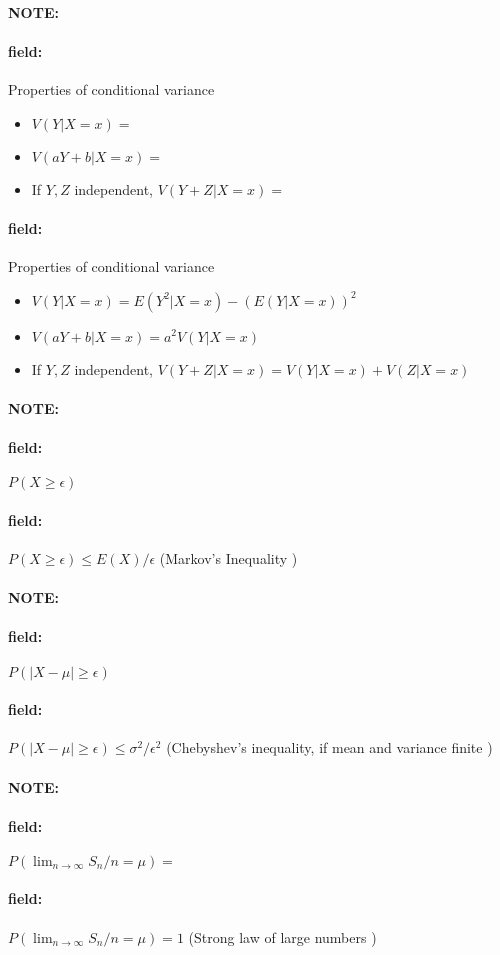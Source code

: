 \documentclass[12pt]{article}
\newenvironment{note}{\paragraph{NOTE:}}{}
\newenvironment{field}{\paragraph{field:}}{}
\begin{document}
\begin{note}
  \begin{field}
    Properties of conditional variance
    \begin{itemize}
      \item $V(Y|X=x) = $
      \item $V(aY + b | X = x) = $
      \item If $Y,Z$ independent, $V(Y+Z | X=x) = $
    \end{itemize}
  \end{field}
  \begin{field}
    Properties of conditional variance
    \begin{itemize}
      \item $V(Y|X=x) = E(Y^2 | X=x) - (E(Y|X=x))^2$
      \item $V(aY + b | X = x) = a^2 V(Y|X=x)$
      \item If $Y,Z$ independent, $V(Y+Z | X=x) = V(Y|X=x) + V(Z|X=x)$
    \end{itemize}
  \end{field}
\end{note}


\begin{note}
  \begin{field}
    $P(X \geq \epsilon)$
  \end{field}
  \begin{field}
    $P(X \geq \epsilon) \leq E(X) / \epsilon$ (Markov's Inequality )
  \end{field}
\end{note}

\begin{note}
  \begin{field}
    $P(|X-\mu| \geq \epsilon)$
  \end{field}
  \begin{field}
    $P(|X-\mu| \geq \epsilon) \leq \sigma^2/\epsilon^2$ (Chebyshev's inequality, if mean and variance finite )
  \end{field}
\end{note}

\begin{note}
  \begin{field}
    $P(\lim_{n\to \infty} S_n/n = \mu) = $
  \end{field}
  \begin{field}
  $P(\lim_{n\to \infty} S_n/n = \mu) = 1$ (Strong law of large numbers )
\end{field}
\end{note}
\end{document}
